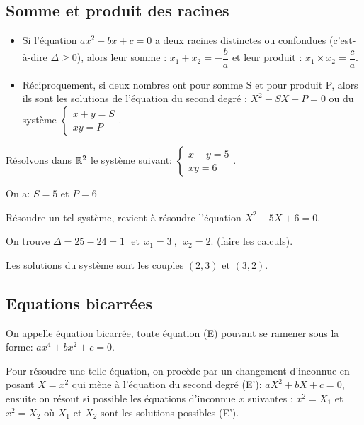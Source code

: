 \subsection*{Somme et produit des racines}
\begin{property}
\begin{itemize}
\item  Si l'équation $ax^2+bx+c=0$ \;a deux racines distinctes ou confondues (c'est-à-dire  $ \Delta  \geq 0  $),\; alors leur somme \; :  $ x_1+x_2=-\dfrac{b}{a} $ \;et\; leur produit \; : $ x_1 \times x_2=\dfrac{c}{a} $.

\item  Réciproquement, si deux nombres ont pour somme S et pour produit P, alors ils sont les solutions de l'équation du second degré : $ X^{2} - SX + P = 0 $    ou  du système  $ \begin{cases} x+y=S \\ xy=P \end{cases} $.
  \end{itemize}
\end{property}
\begin{example}

Résolvons dans $ \mathbb{R}^{2} $ le système suivant:\; $ \begin{cases} x+y=5 \\ xy=6 \end{cases} $.
 \end{example}

 On a:\; $ S=5 $ et $ P=6 $
 
   Résoudre un tel système, revient à résoudre l'équation $X^{2} - 5X + 6 = 0   $.
   
On trouve  $\Delta= 25- 24=1~~~\text{et} ~~ x_{1}=3~,~~x_{2}=2$.\; (faire les calculs).

Les solutions du système  sont les couples $(2,3) $ et $(3,2) $.


\subsection*{Equations bicarrées}

\begin{definition}

On appelle équation bicarrée, toute équation (E) pouvant se ramener sous la forme:      $ ax^{4}+bx^{2} +c=0$. 
\end{definition}

\medskip
Pour résoudre une telle équation, on procède par un changement d'inconnue en posant $ X=x^{2} $ qui mène à l'équation du  second degré  (E'): $ aX^{2}+bX +c=0$, ensuite on résout si possible les équations d'inconnue $ x $ suivantes ; $ x^{2}=X_{1} $   et $ x^{2}=X_{2} $ où $X_{1} $ et $ X_{2}$ sont les solutions possibles (E').

